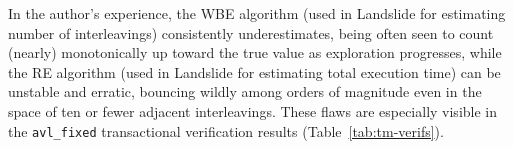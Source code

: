 In the author's experience,
the WBE algorithm (used in Landslide for estimating number of interleavings) consistently underestimates,
being often seen to count (nearly) monotonically up toward the true value as exploration progresses,
while the RE algorithm (used in Landslide for estimating total execution time) can be unstable and erratic,
bouncing wildly among orders of magnitude even in the space of ten or fewer adjacent interleavings.
These flaws are especially visible in the {\tt avl\_fixed} transactional verification results (Table~\ref{tab:tm-verifs}).






